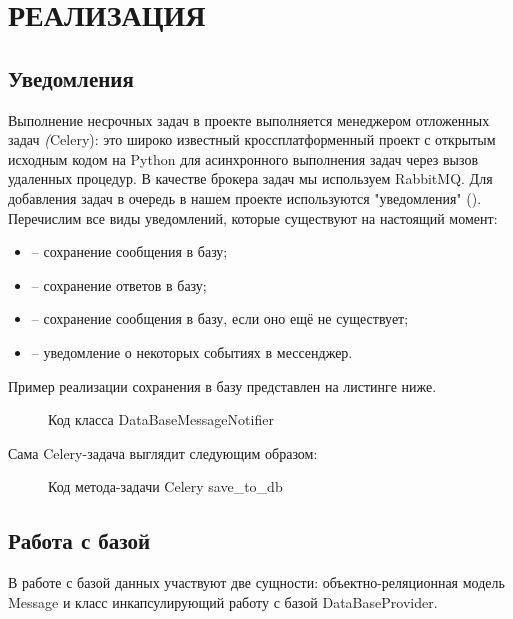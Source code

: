 \section{РЕАЛИЗАЦИЯ}
    \subsection{Уведомления}
    Выполнение несрочных задач в проекте выполняется менеджером отложенных задач \textit(Celery):
    это широко известный кроссплатформенный проект с открытым исходным кодом на Python для
    асинхронного выполнения задач через вызов удаленных процедур.
    В качестве брокера задач мы используем RabbitMQ\cite{docs.rabbitmq}.
    Для добавления задач в очередь в нашем проекте используются "уведомления" ().
    Перечислим все виды уведомлений, которые существуют на настоящий момент:
    \begin{itemize}
        \item {} -- сохранение сообщения в базу;
        \item {} -- сохранение ответов в базу;
        \item {} -- сохранение сообщения в базу, если оно ещё не существует;
        \item {} -- уведомление о некоторых событиях в мессенджер.
    \end{itemize}
    Пример реализации сохранения в базу представлен на листинге ниже.

    \begin{figure}[!h]
        \centering
        
        \caption{Код класса DataBaseMessageNotifier}
        \label{fig:data_base_message_notifier}
    \end{figure}

    Сама Celery-задача выглядит следующим образом:

    \begin{figure}[!h]
        \centering
        
        \caption{Код метода-задачи Celery save\_to\_db}
        \label{fig:celery_task}
    \end{figure}

    \subsection{Работа с базой}
    В работе с базой данных участвуют две сущности: объектно-реляционная модель Message
    и класс инкапсулирующий работу с базой DataBaseProvider.

